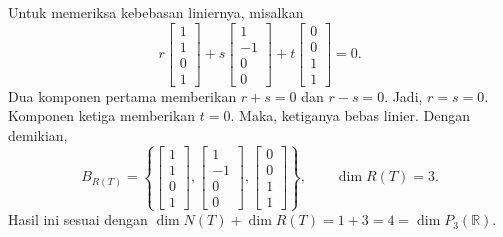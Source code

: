 \documentclass[11pt,a4paper]{article}
\newcommand{\R}{\mathbb{R}}
\begin{document}
\begin{enumerate}[itemsep=12pt,parsep=5pt]
\begin{enumerate}
                Untuk memeriksa kebebasan liniernya, misalkan
                \[
                  r\begin{bmatrix}1\\1\\0\\1\end{bmatrix}
                  +s\begin{bmatrix}1\\-1\\0\\0\end{bmatrix}
                  +t\begin{bmatrix}0\\0\\1\\1\end{bmatrix}=0.
                \]
                Dua komponen pertama memberikan $r+s=0$ dan $r-s=0$.
                Jadi, $r=s=0$.
                Komponen ketiga memberikan $t=0$.
                Maka, ketiganya bebas linier.
                Dengan demikian,
                \[
                  B_{R(T)}=\left\{
                  \begin{bmatrix}1\\1\\0\\1\end{bmatrix},
                  \begin{bmatrix}1\\-1\\0\\0\end{bmatrix},
                  \begin{bmatrix}0\\0\\1\\1\end{bmatrix}
                  \right\},
                  \qquad\dim R(T)=3.
                \]
                Hasil ini sesuai dengan $\dim N(T)+\dim R(T)=1+3=4=\dim P_3(\R)$.
        \end{enumerate}


\end{enumerate}
\end{document}
